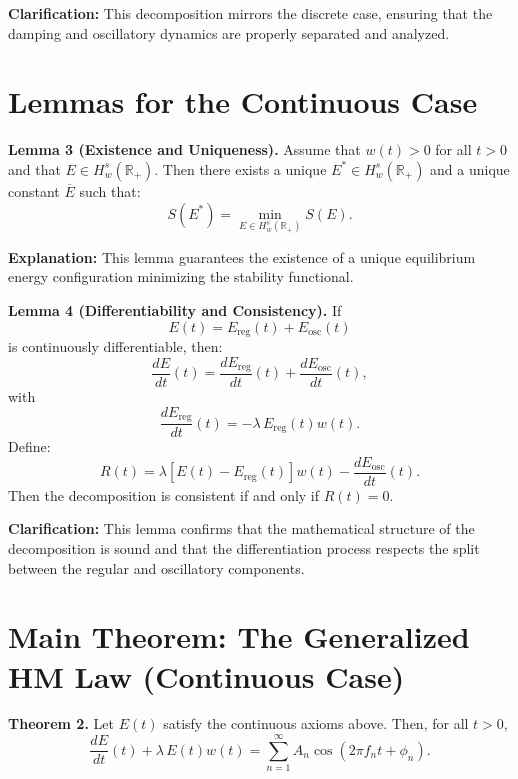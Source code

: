 \documentclass[11pt]{article}
\begin{document}
\textbf{Clarification:} This decomposition mirrors the discrete case, ensuring that the damping and oscillatory dynamics are properly separated and analyzed.

\section{Lemmas for the Continuous Case}

\textbf{Lemma 3 (Existence and Uniqueness).} Assume that $w(t)>0$ for all $t>0$ and that $E\in H_w^s(\mathbb{R}_{+})$. Then there exists a unique $E^*\in H_w^s(\mathbb{R}_{+})$ and a unique constant $\overline{E}$ such that:
\[
S(E^*)=\min_{E\in H_w^s(\mathbb{R}_{+})} S(E).
\]

\textbf{Explanation:} This lemma guarantees the existence of a unique equilibrium energy configuration minimizing the stability functional.

\bigskip

\textbf{Lemma 4 (Differentiability and Consistency).} If
\[
E(t)=E_{\mathrm{reg}}(t)+E_{\mathrm{osc}}(t)
\]
is continuously differentiable, then:
\[
\frac{dE}{dt}(t)=\frac{dE_{\mathrm{reg}}}{dt}(t)+\frac{dE_{\mathrm{osc}}}{dt}(t),
\]
with
\[
\frac{dE_{\mathrm{reg}}}{dt}(t)=-\lambda\,E_{\mathrm{reg}}(t)w(t).
\]
Define:
\[
R(t)=\lambda\left[E(t)-E_{\mathrm{reg}}(t)\right]w(t)-\frac{dE_{\mathrm{osc}}}{dt}(t).
\]
Then the decomposition is consistent if and only if $R(t)=0$.

\textbf{Clarification:} This lemma confirms that the mathematical structure of the decomposition is sound and that the differentiation process respects the split between the regular and oscillatory components.

\section{Main Theorem: The Generalized HM Law (Continuous Case)}

\textbf{Theorem 2.} Let $E(t)$ satisfy the continuous axioms above. Then, for all $t>0$,
\[
\frac{dE}{dt}(t)+\lambda\,E(t)w(t)=\sum_{n=1}^{\infty} A_n \cos\left(2\pi f_n t+\phi_n\right).
\]
\end{document}
